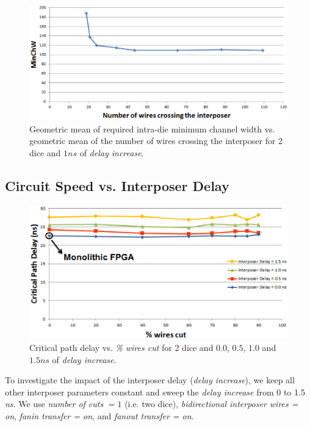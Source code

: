 \documentclass[journal]{IEEEtran}
\begin{document}
\begin{figure}[!t]
\centering
\includegraphics[width=\linewidth]{numberofcrossingwires_new.eps}
\caption{Geometric mean of required intra-die minimum channel width vs. geometric mean of the number of wires crossing the interposer for 2 dice and $1ns$ of \textit{delay increase}.}
\label{fig:crossingwires}
\end{figure}

\subsection{Circuit Speed vs. Interposer Delay}


\begin{figure}[!b]
\centering
\includegraphics[width=\linewidth]{delays_crit_path_new.eps}
\caption{Critical path delay vs. \textit{\% wires cut} for 2 dice and $0.0$, $0.5$, $1.0$ and $1.5ns$ of \textit{delay increase}.}
\label{fig:delays_crit}
\end{figure}

To investigate the impact of the interposer delay (\textit{delay increase}), we keep all other interposer parameters constant and sweep the \textit{delay increase} from 0 to 1.5 \textit{ns}. We use \textit{number of cuts} $= 1$ (i.e. two dice), \textit{bidirectional interposer wires = on}, \textit{fanin transfer = on}, and \textit{fanout transfer = on}.
\end{document}
